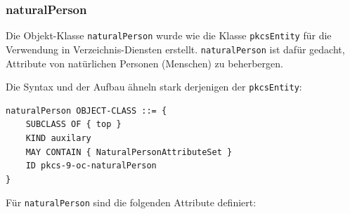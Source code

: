\documentclass[10pt,a4paper]{article}
\begin{document}
\subsubsection{naturalPerson}
Die Objekt-Klasse \texttt{naturalPerson} wurde wie die Klasse \texttt{pkcsEntity} für die
Verwendung in Verzeichnis-Diensten erstellt. \texttt{naturalPerson} ist dafür gedacht,
Attribute von natürlichen Personen (Menschen) zu beherbergen.

Die Syntax und der Aufbau ähneln stark derjenigen der \texttt{pkcsEntity}:
\begin{verbatim}
naturalPerson OBJECT-CLASS ::= {
    SUBCLASS OF { top }
    KIND auxilary
    MAY CONTAIN { NaturalPersonAttributeSet }
    ID pkcs-9-oc-naturalPerson
}
\end{verbatim}

Für \texttt{naturalPerson} sind die folgenden Attribute definiert:
\end{document}
